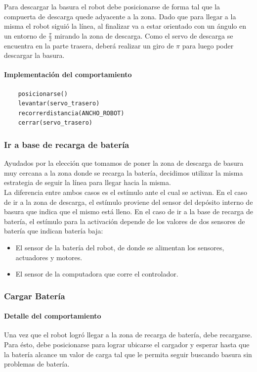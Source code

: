 Para descargar la basura el robot debe posicionarse de forma tal que la
compuerta de descarga quede adyacente a la zona. Dado que para llegar a la
misma el robot sigui\'o la l\'inea, al finalizar va a estar orientado con un
\'angulo en un entorno de $\frac{\pi}{2}$ mirando la zona de descarga. Como el
servo de descarga se encuentra en la parte trasera, deber\'a realizar un giro
de $\pi$ para luego poder descargar la basura.

\paragraph{Implementaci\'on del comportamiento}
\begin{verbatim}
    posicionarse()
    levantar(servo_trasero)
    recorrerdistancia(ANCHO_ROBOT)
    cerrar(servo_trasero)
\end{verbatim}

\subsubsection{Ir a base de recarga de bater\'ia}
\label{go_to_recharge}
Ayudados por la elecci\'on que tomamos de poner la zona de descarga de basura
muy cercana a la zona donde se recarga la bater\'ia, decidimos utilizar la
misma estrategia de seguir la l\'inea para llegar hacia la misma.
\\\indent
La diferencia
entre ambos casos es el est\'imulo ante el cual se activan. En el caso de
ir a la zona de descarga, el est\'imulo proviene del sensor del dep\'osito
interno de basura que indica que el mismo est\'a lleno. En el caso de ir
a la base de recarga de bater\'ia, el est\'imulo para la activaci\'on depende
de los valores de dos sensores de bater\'ia que indican bater\'ia baja:
\begin{itemize}
	\item El sensor de la bater\'ia del robot, de donde se alimentan los sensores,
			actuadores y motores.
	\item El sensor de la computadora que corre el controlador.
\end{itemize}

\subsubsection{Cargar Bater\'ia}
\label{recharge_battery}
\paragraph{Detalle del comportamiento}
Una vez que el robot logr\'o llegar a la zona de recarga de bater\'ia, debe
recargarse. Para \'esto, debe posicionarse para lograr ubicarse el cargador
y esperar hasta que la bater\'ia alcance un valor de carga tal que le
permita seguir buscando basura sin problemas de bater\'ia.

